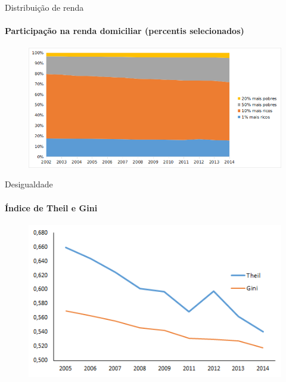 \documentclass[pdf, xcolor=table]{beamer}
\begin{document}
\begin{frame}{Distribuição de renda}
\framesubtitle{Participação na renda domiciliar (percentis selecionados)}
\begin{figure}[htb]
    \centering
    \includegraphics[width = 1.1\textwidth]{Part_Renda_Dom.png}
\end{figure}
    
\end{frame}



\begin{frame}{Desigualdade}
\framesubtitle{Índice de Theil e Gini}

    \begin{figure}
    \centering
    \label{plot_Theil}
    \includegraphics[width=0.8\paperwidth,height=0.8\paperheight]{Plot_Theil_Gini.png}
\end{figure}
\end{frame}
\end{document}
